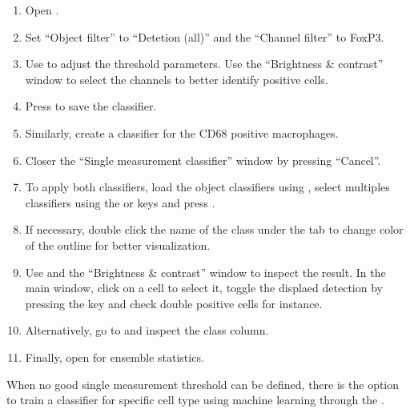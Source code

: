 \documentclass[a4paper,DIV=17,dvipsnames,headsepline]{scrartcl}
\begin{document}
\begin{enumerate}
\item Open .
\item Set ``Object filter'' to ``Detetion (all)'' and the ``Channel filter'' to FoxP3.
\item Use  to adjust the threshold parameters. Use the ``Brightness \& contrast'' window to select the channels to better identify positive cells.
\item Press  to save the classifier.
\item Similarly, create a classifier for the CD68 positive macrophages.
\item Closer the ``Single measurement classifier'' window by pressing ``Cancel''.
\item To apply both classifiers, load the object classifiers using , select multiples classifiers using the \keys{\shift} or \keys{\ctrl} keys and press .
\item If necessary, double click the name of the class under the  tab to change color of the outline for better visualization.
\item Use  and the ``Brightness \& contrast'' window to inspect the result. In the main window, click on a cell to select it, toggle the displaed detection by pressing the key  and check double positive cells for instance.
\item Alternatively, go to  and inspect the class column.
\item Finally, open  for ensemble statistics.
\end{enumerate}

 When no good single measurement threshold can be defined, there is the option to train a classifier for specific cell type using machine learning through the .


        
\end{document}
